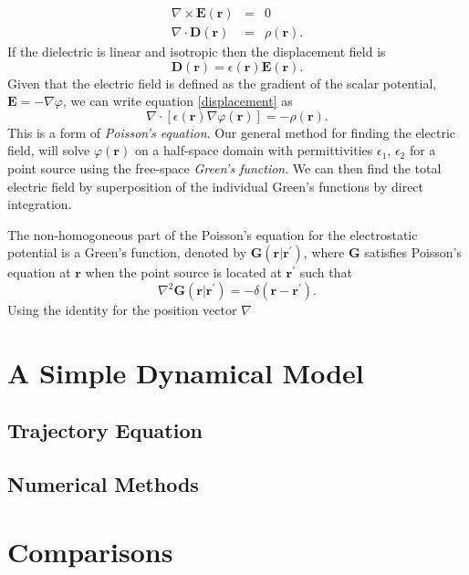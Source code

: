 \documentclass[a4paper, 12pt]{article}
\begin{document}
\begin{eqnarray}
\nabla \times \mathbf{E(r)}&=&0 \\
\nabla \cdot \mathbf{D(r)}&=&\rho(\mathbf{r}).
\end{eqnarray}
If the dielectric is linear and isotropic then the displacement field is 
\begin{equation}\label{displacement}
\mathbf{D(r)} = \epsilon(\mathbf{r})\mathbf{E}(\mathbf{r}).
\end{equation}
Given that the electric field is defined as the gradient of the scalar potential, $\mathbf{E}=-\nabla \varphi $, we can write equation \ref{displacement} as 
\begin{equation}
\nabla \cdot \left[\epsilon(\mathbf{r})\nabla \varphi (\mathbf{r}) \right] = -\rho (\mathbf{r}).
\end{equation}
This is a form of \emph{Poisson's equation}. Our general method for finding the electric field, will solve $\varphi (\mathbf{r})$ on a half-space domain with permittivities $\epsilon_1$, $\epsilon_2$ for a point source using the free-space \emph{Green's function}. We can then find the total electric field by superposition of the individual Green's functions by direct integration.

The non-homogoneous part of the Poisson's equation for the electrostatic potential is a Green's function, denoted by $\mathbf{G}(\mathbf{r} | \mathbf{r^\prime})$, where $\mathbf{G}$ satisfies Poisson's equation at $\mathbf{r}$ when the point source is located at $\mathbf{r^\prime}$ such that
\begin{equation}
\nabla^2 \mathbf{G}(\mathbf{r} | \mathbf{r^\prime}) = -\delta( \mathbf{r} - \mathbf{r^\prime}).
\end{equation}
Using the identity for the position vector $\nabla$

\section{A Simple Dynamical Model}
\subsection{Trajectory Equation}
\subsection{Numerical Methods}

\section{Comparisons}
\end{document}
